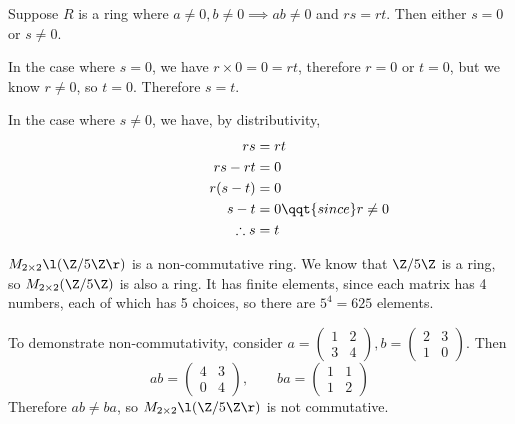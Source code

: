 \documentclass[a4paper]{article}
\begin{document}

Suppose $R$ is a ring where $a \ne 0, b \ne 0 \implies ab \ne 0$ and $rs = rt$. Then either $s = 0$ or $s \ne 0$.

In the case where $s = 0$, we have $r \times 0 = 0 = rt$, therefore $r=0$ or $t=0$, but we know $r \ne 0$, so $t = 0$. Therefore $s=t$.

In the case where $s \ne 0$, we have, by distributivity, \begin{align*}
	rs &= rt\\
	\phantom{paddingpaddi} rs - rt &= 0\\
	r (s - t) &= 0\\
	s - t &= 0 \qqt{since } r \ne 0\\
	\therefore s &= t
\end{align*}


$M_{2 \times 2} \l( \Z / 5\Z \r)$ is a non-commutative ring. We know that $\Z / 5\Z$ is a ring, so $M_{2 \times 2}(\Z / 5 \Z)$ is also a ring. It has finite elements, since each matrix has 4 numbers, each of which has 5 choices, so there are $5^4 = 625$ elements.

To demonstrate non-commutativity, consider $a = \begin{pmatrix}1 & 2\\ 3 & 4\end{pmatrix}, b = \begin{pmatrix}2 & 3\\ 1 & 0\end{pmatrix}$. Then $$ab = \begin{pmatrix}4 & 3\\ 0 & 4\end{pmatrix}, \qquad ba = \begin{pmatrix}1 & 1\\ 1 & 2\end{pmatrix}$$
Therefore $ab \ne ba$, so $M_{2 \times 2} \l( \Z / 5\Z \r)$ is not commutative.
\end{document}
